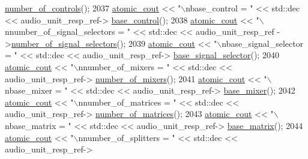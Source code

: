 \begin{DoxyCode}
      \hyperlink{classavdecc__lib_1_1audio__unit__descriptor__response_a5accf7abc7d231a0767ad5cac68b8b39}{number\_of\_controls}();
2037             \hyperlink{cmd__line_8h_a0bc38ccc65c79ba06c6fcd7b4bf554c3}{atomic\_cout} << \textcolor{stringliteral}{"\(\backslash\)nbase\_control = "} << std::dec << audio\_unit\_resp\_ref->
      \hyperlink{classavdecc__lib_1_1audio__unit__descriptor__response_ac1f5297533142234c764e84c01ce5a16}{base\_control}();
2038             \hyperlink{cmd__line_8h_a0bc38ccc65c79ba06c6fcd7b4bf554c3}{atomic\_cout} << \textcolor{stringliteral}{"\(\backslash\)nnumber\_of\_signal\_selectors = "} << std::dec << audio\_unit\_resp\_ref
      ->\hyperlink{classavdecc__lib_1_1audio__unit__descriptor__response_a350017f1d53dba157c2df60426d3e276}{number\_of\_signal\_selectors}();
2039             \hyperlink{cmd__line_8h_a0bc38ccc65c79ba06c6fcd7b4bf554c3}{atomic\_cout} << \textcolor{stringliteral}{"\(\backslash\)nbase\_signal\_selector = "} << std::dec << audio\_unit\_resp\_ref->
      \hyperlink{classavdecc__lib_1_1audio__unit__descriptor__response_a6d7d2edd587a7d86e5baf733b8edfa13}{base\_signal\_selector}();
2040             \hyperlink{cmd__line_8h_a0bc38ccc65c79ba06c6fcd7b4bf554c3}{atomic\_cout} << \textcolor{stringliteral}{"\(\backslash\)nnumber\_of\_mixers = "} << std::dec << audio\_unit\_resp\_ref->
      \hyperlink{classavdecc__lib_1_1audio__unit__descriptor__response_a149b4c82d8617ca1b8a1fab50d2f73b4}{number\_of\_mixers}();
2041             \hyperlink{cmd__line_8h_a0bc38ccc65c79ba06c6fcd7b4bf554c3}{atomic\_cout} << \textcolor{stringliteral}{"\(\backslash\)nbase\_mixer = "} << std::dec << audio\_unit\_resp\_ref->
      \hyperlink{classavdecc__lib_1_1audio__unit__descriptor__response_afba53952304abeb8ae5cfba51f91fa8a}{base\_mixer}();
2042             \hyperlink{cmd__line_8h_a0bc38ccc65c79ba06c6fcd7b4bf554c3}{atomic\_cout} << \textcolor{stringliteral}{"\(\backslash\)nnumber\_of\_matrices = "} << std::dec << audio\_unit\_resp\_ref->
      \hyperlink{classavdecc__lib_1_1audio__unit__descriptor__response_ac47cb4ee3e605cbbf9d4332ba9df2930}{number\_of\_matrices}();
2043             \hyperlink{cmd__line_8h_a0bc38ccc65c79ba06c6fcd7b4bf554c3}{atomic\_cout} << \textcolor{stringliteral}{"\(\backslash\)nbase\_matrix = "} << std::dec << audio\_unit\_resp\_ref->
      \hyperlink{classavdecc__lib_1_1audio__unit__descriptor__response_ae35ea1aade036bd33159a9c5c87b9dd7}{base\_matrix}();
2044             \hyperlink{cmd__line_8h_a0bc38ccc65c79ba06c6fcd7b4bf554c3}{atomic\_cout} << \textcolor{stringliteral}{"\(\backslash\)nnumber\_of\_splitters = "} << std::dec << audio\_unit\_resp\_ref->

\end{DoxyCode}
